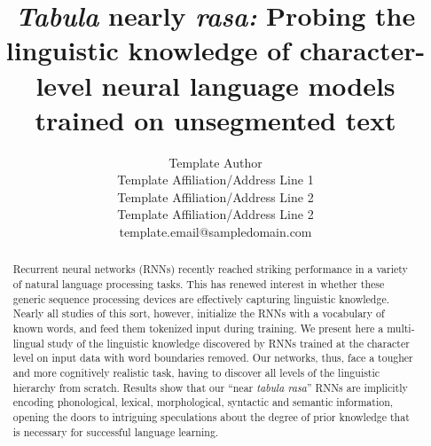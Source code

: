 %
\iftaclfinal
\newcommand{\taclpaper}{camera-ready\xspace}
\newcommand{\taclpapers}{camera-readies\xspace}
\newcommand{\Taclpaper}{Camera-ready\xspace}
\newcommand{\Taclpapers}{Camera-readies\xspace}
\else
\newcommand{\taclpaper}{submission\xspace}
\newcommand{\taclpapers}{{\taclpaper}s\xspace}
\newcommand{\Taclpaper}{Submission\xspace}
\newcommand{\Taclpapers}{{\Taclpaper}s\xspace}
\fi

\newif\iftaclinstructions
\taclinstructionsfalse %
\iftaclinstructions
\renewcommand{\confidential}{}
\renewcommand{\anonsubtext}{(No author info supplied here, for consistency with
TACL-submission anonymization requirements)}
\fi

\title{\emph{Tabula} nearly \emph{rasa:} Probing the linguistic knowledge of character-level neural language models trained on unsegmented text}


\author{
 Template Author \\
 Template Affiliation/Address Line 1 \\
 Template Affiliation/Address Line 2 \\
 Template Affiliation/Address Line 2 \\
  {\sf template.email@sampledomain.com} \\
}

\date{}


\maketitle
\begin{abstract}
Recurrent neural networks (RNNs) recently reached striking performance in a variety of natural language processing tasks. This has renewed interest in whether these generic sequence processing devices are effectively capturing linguistic knowledge. Nearly all studies of this sort, however, initialize the RNNs with a vocabulary of known words, and feed them tokenized input during training. We present here a multi-lingual study of the linguistic knowledge discovered by RNNs trained at the character level on input data with word boundaries removed. Our networks, thus, face a tougher and more cognitively realistic task, having to discover all levels of the linguistic hierarchy from scratch. Results show that our ``near \emph{tabula rasa}'' RNNs are implicitly encoding phonological, lexical, morphological, syntactic and semantic information, opening the doors to intriguing speculations about the degree of prior knowledge that is necessary for successful language learning.
\end{abstract}



